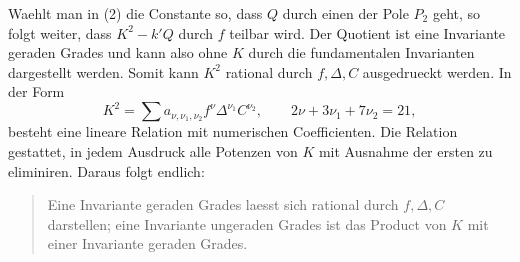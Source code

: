 \documentclass[11pt]{article}
\begin{document}
Waehlt man in (2) die Constante so, dass \(Q\) durch einen der Pole \(P_2\) geht, so folgt weiter, dass \(K^2-k'Q\) durch \(f\) teilbar wird. Der Quotient ist eine Invariante geraden Grades und kann also ohne \(K\) durch die fundamentalen Invarianten dargestellt werden. Somit kann \(K^2\) rational durch \(f,\Delta,C\) ausgedrueckt werden. In der Form
\begin{equation}
K^2=\sum a_{\nu,\nu_1,\nu_2} f^\nu\Delta^{\nu_1}C^{\nu_2},
\qquad
2\nu+3\nu_1+7\nu_2=21,
\tag{3}
\end{equation}
besteht eine lineare Relation mit numerischen Coefficienten. Die Relation gestattet, in jedem Ausdruck alle Potenzen von \(K\) mit Ausnahme der ersten zu eliminiren. Daraus folgt endlich:
\begin{quote}
Eine Invariante geraden Grades laesst sich rational durch \(f,\Delta,C\) darstellen; eine Invariante ungeraden Grades ist das Product von \(K\) mit einer Invariante geraden Grades.
\end{quote}

\clearpage
\end{document}
